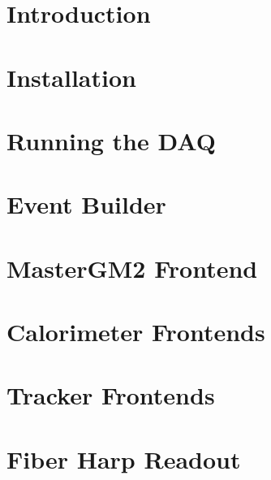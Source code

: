 




%


\tableofcontents

\newpage

\chapter{Introduction}

\chapter{Installation}



\chapter{Running the DAQ}



\chapter{Event Builder}



\chapter{MasterGM2 Frontend}



\chapter{Calorimeter Frontends}



\chapter{Tracker Frontends}



\chapter{Fiber Harp Readout}

